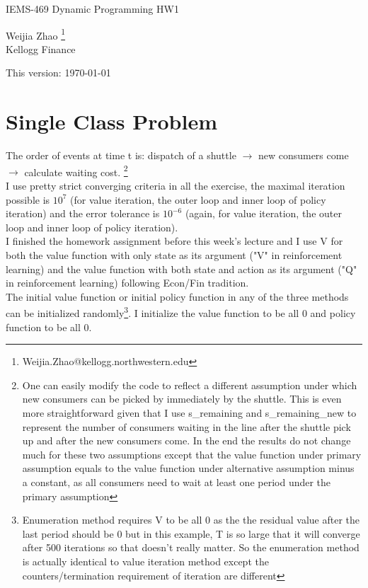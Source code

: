 \documentclass[12pt,letterpaper]{article}
\begin{document}
\begin{center}
\large IEMS-469 Dynamic Programming  HW1

\bigskip
Weijia Zhao \footnote{Weijia.Zhao@kellogg.northwestern.edu}\\
Kellogg Finance

\bigskip
This version: \today
\end{center}

\newpage

\section{Single Class Problem}
The order of events at time t is: dispatch of a shuttle $\rightarrow$ new consumers come $\rightarrow$ calculate waiting cost.  \footnote{One can easily modify the code to reflect a different assumption under which new consumers can be picked by immediately by the shuttle. This is even more straightforward given that I use s\_remaining and s\_remaining\_new to represent the number of consumers waiting in the line after the shuttle pick up and after the new consumers come. In the end the results do not change much for these two assumptions except that the value function under primary assumption equals to the value function under alternative assumption minus a constant, as all consumers need to wait at least one period under the primary assumption}\\

I use pretty strict converging criteria in all the exercise, the maximal iteration possible is $10^7$ (for value iteration, the outer loop and inner loop of policy iteration) and the error tolerance is $10^{-6}$ (again, for value iteration, the outer loop and inner loop of policy iteration).\\

I finished the homework assignment before this week's lecture and I use V for both the value function with only state as its argument ("V" in reinforcement learning) and the value function with both state and action as its argument ("Q" in reinforcement learning) following Econ/Fin tradition. \\

The initial value function or initial policy function in any of the three methods can be initialized randomly\footnote{Enumeration method requires V to be all 0 as the the residual value after the last period should be 0 but in this example, T is so large that it will converge after 500 iterations so that doesn't really matter. So the enumeration method is actually identical to value iteration method except the counters/termination requirement of iteration are different}. I initialize the value function to be all 0 and policy function to be all 0. \\
\end{document}
